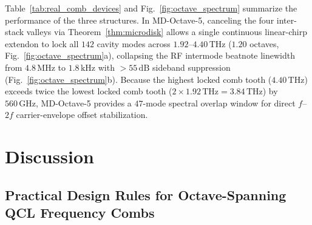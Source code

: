 \documentclass[11pt,letterpaper]{article}
\begin{document}
Table~\ref{tab:real_comb_devices} and Fig.~\ref{fig:octave_spectrum} summarize the performance of the three structures. In MD-Octave-5, canceling the four inter-stack valleys via Theorem~\ref{thm:microdisk} allows a single continuous linear-chirp extendon to lock all $142$ cavity modes across $1.92\text{--}4.40\,\mathrm{THz}$ ($1.20$ octaves, Fig.~\ref{fig:octave_spectrum}a), collapsing the RF intermode beatnote linewidth from $4.8\,\mathrm{MHz}$ to $1.8\,\mathrm{kHz}$ with $>55\,\mathrm{dB}$ sideband suppression (Fig.~\ref{fig:octave_spectrum}b). Because the highest locked comb tooth ($4.40\,\mathrm{THz}$) exceeds twice the lowest locked comb tooth ($2 \times 1.92\,\mathrm{THz} = 3.84\,\mathrm{THz}$) by $560\,\mathrm{GHz}$, MD-Octave-5 provides a $47$-mode spectral overlap window for direct $f$--$2f$ carrier-envelope offset stabilization.

\section{Discussion}
\label{sec:discussion}

\subsection{Practical Design Rules for Octave-Spanning QCL Frequency Combs}
\label{subsec:design_rules}
\end{document}
